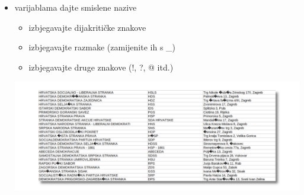 \documentclass[aspectratio=169]{beamer}
\begin{document}
\begin{frame}
    \begin{itemize}
        \setlength{\itemsep}{2em}

        \item varijablama dajte smislene nazive

            \begin{itemize}
                \item izbjegavajte dijakritičke znakove

                \item izbjegavajte razmake (zamijenite ih s \_)

                \item izbjegavajte druge znakove (!, ?, @ itd.)

            \end{itemize}

            \pause

            \vspace*{1.5em}

            \begin{center}

            \includegraphics[scale=.32]{images/meaningless-party.png}

            \end{center}

    \end{itemize}
\end{frame}
\end{document}
